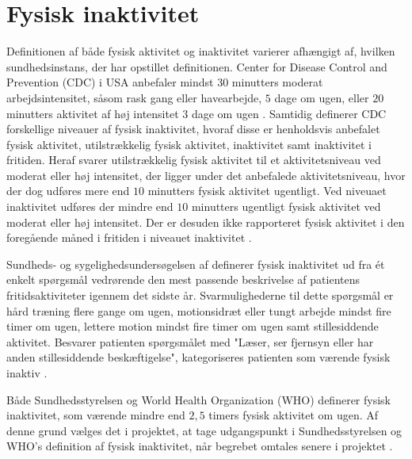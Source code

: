 \section{Fysisk inaktivitet}

Definitionen af både fysisk aktivitet og inaktivitet varierer afhængigt af, hvilken sundhedsinstans, der har opstillet definitionen. Center for Disease Control and Prevention (CDC) i USA anbefaler mindst $30$ minutters moderat arbejdsintensitet, såsom rask gang eller havearbejde, $5$ dage om ugen, eller $20$ minutters aktivitet af høj intensitet $3$ dage om ugen \citep{motionsraad2007,christensen2012}.
Samtidig definerer CDC forskellige niveauer af fysisk inaktivitet, hvoraf disse er henholdsvis anbefalet fysisk aktivitet, utilstrækkelig fysisk aktivitet, inaktivitet samt inaktivitet i fritiden. Heraf svarer utilstrækkelig fysisk aktivitet til et aktivitetsniveau ved moderat eller høj intensitet, der ligger under det anbefalede aktivitetsniveau, hvor der dog udføres mere end $10$ minutters fysisk aktivitet ugentligt. Ved niveuaet inaktivitet udføres der mindre end $10$ minutters ugentligt fysisk aktivitet ved moderat eller høj intensitet. Der er desuden ikke rapporteret fysisk aktivitet i den foregående måned i fritiden i niveauet inaktivitet  \citep{motionsraad2007,christensen2012}.

Sundheds- og sygelighedsundersøgelsen af \citeauthor{christensen2012} definerer fysisk inaktivitet ud fra ét enkelt spørgsmål vedrørende den mest passende beskrivelse af patientens fritidsaktiviteter igennem det sidste år. Svarmulighederne til dette spørgsmål er hård træning flere gange om ugen, motionsidræt eller tungt arbejde mindst fire timer om ugen, lettere motion mindst fire timer om ugen samt stillesiddende aktivitet. Besvarer patienten spørgsmålet med "Læser, ser fjernsyn eller har anden stillesiddende beskæftigelse", kategoriseres patienten som værende fysisk inaktiv \citep{motionsraad2007,christensen2012}.

Både Sundhedsstyrelsen og World Health Organization (WHO) definerer fysisk inaktivitet, som værende mindre end $2,5$ timers fysisk aktivitet om ugen. Af denne grund vælges det i projektet, at tage udgangspunkt i Sundhedsstyrelsen og WHO's definition af fysisk inaktivitet, når begrebet omtales senere i projektet \citep{motionsraad2007}.